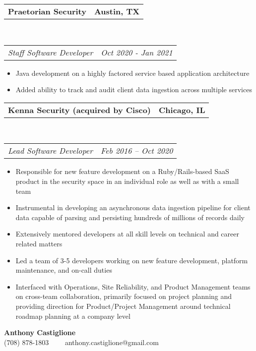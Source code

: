\documentclass[10pt,letterpaper]{article}
\makeatletter
\newcommand{\headerrow}[2]
{\begin{tabular*}{\linewidth}{l@{\extracolsep{\fill}}r}
  #1 &
  #2 \\
\end{tabular*}}
\newenvironment{indentsection}[1]%
{\begin{list}{}%
  {\setlength{\leftmargin}{#1}}%
  \item[]%
}
{\end{list}}
\makeatother
\begin{document}
\begin{indentsection}{\parindent}
  \headerrow
    {\textbf{Praetorian Security} }
    {\textbf{Austin, TX}}
  \\
  \headerrow
    {\emph{Staff Software Developer}}
    {\emph{Oct 2020 - Jan 2021}}

  \begin{itemize}
  \renewcommand{\labelitemi}{$-$}
  \vspace{-0.1in}
    \item Java development on a highly factored service based application architecture
    \item Added ability to track and audit client data ingestion across multiple services
  \end{itemize}
\end{indentsection}
\begin{indentsection}{\parindent}
  \headerrow
    {\textbf{Kenna Security (acquired by Cisco)} }
    {\textbf{Chicago, IL}}
  \\
  \headerrow
    {\emph{Lead Software Developer}}
    {\emph{Feb 2016 -- Oct 2020}}

  \begin{itemize}
  \renewcommand{\labelitemi}{$-$}
  \vspace{-0.1in}
    \item Responsible for new feature development on a Ruby/Rails-based SaaS product in the security space in an individual role as well as with a small team
    \item Instrumental in developing an asynchronous data ingestion pipeline for client data capable of parsing and persisting hundreds of millions of records daily
    \item Extensively mentored developers at all skill levels on technical and career related matters
    \item Led a team of 3-5 developers working on new feature development, platform maintenance, and on-call duties
    \item Interfaced with Operations, Site Reliability, and Product Management teams on cross-team collaboration, primarily focused on project planning and providing direction for Product/Project Management around technical roadmap planning at a company level
  \end{itemize}
\end{indentsection}
\pagebreak
\begin{center}
  {\LARGE \textbf {Anthony Castiglione}} \\ (708) 878-1803 \ \ \textbullet \ \ anthony.castiglione@gmail.com
\end{center}
\end{document}
